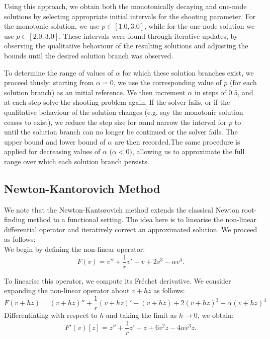 \documentclass[12pt]{article}
\begin{document}
Using this approach, we obtain both the monotonically decaying and one-node solutions by selecting appropriate initial intervals for the shooting parameter. For the monotonic solution, we use $p \in [1.0, 3.0]$, while for the one-node solution we use $p \in [2.0, 3.0]$. These intervals were found through iterative updates, by observing the qualitative behaviour of the resulting solutions and adjusting the bounds until the desired solution branch was observed.

\vspace{0.3cm}

To determine the range of values of $\alpha$ for which these solution branches exist, we proceed thusly: starting from $\alpha = 0$, we use the corresponding value of $p$ (for each solution branch) as an initial reference. We then increment $\alpha$ in steps of $0.5$, and at each step solve the shooting problem again. If the solver fails, or if the qualitative behaviour of the solution changes (e.g. say the monotonic solution ceases to exist), we reduce the step size for $\alpha$and narrow the interval for $p$ to until the solution branch can no longer be continued or the solver fails. The upper bound and lower bound of $\alpha$ are then recorded.The same procedure is applied for decreasing values of $\alpha$ ($\alpha<0)$, allowing us to approximate the full range over which each solution branch persists.\\

\subsection*{Newton-Kantorovich Method}

We note that the Newton-Kantorovich method extends the classical Newton root-finding method to a functional setting. The idea here is to linearise the non-linear differential operator and iteratively correct an approximated solution. We proceed as follows: \\

We begin by defining the non-linear operator:\\
\[
F(v) = v'' + \frac{1}{r}v' - v + 2v^3 - \alpha v^4.
\]

To linearise this operator, we compute its Fréchet derivative. We consider expanding the non-linear operator about $v+hz$ as follows:
\[
F(v + hz) = (v + hz)'' + \frac{1}{r}(v + hz)' - (v + hz)
+ 2(v + hz)^3 - \alpha (v + hz)^4
\]
Differentiating with respect to $h$ and taking the limit as $h \to 0$, we obtain:\\
\[
F'(v)[z] = z'' + \frac{1}{r}z' - z + 6v^2 z - 4\alpha v^3 z.
\]
\end{document}
